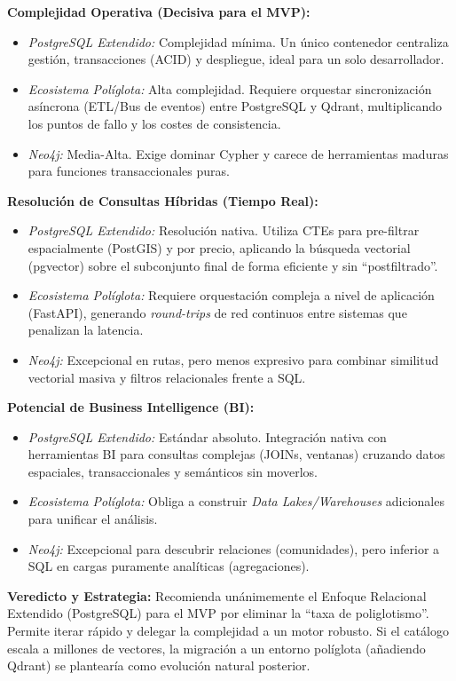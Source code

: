 \begin{tcolorbox}[colback=responsecolor, title=Insights de DeepSeek, colframe=gray!60!black, breakable]
	\textbf{Complejidad Operativa (Decisiva para el MVP):}
	\begin{itemize}
		\item \textit{PostgreSQL Extendido:} Complejidad mínima. Un único contenedor centraliza gestión, transacciones (ACID) y despliegue, ideal para un solo desarrollador.
		\item \textit{Ecosistema Políglota:} Alta complejidad. Requiere orquestar sincronización asíncrona (ETL/Bus de eventos) entre PostgreSQL y Qdrant, multiplicando los puntos de fallo y los costes de consistencia.
		\item \textit{Neo4j:} Media-Alta. Exige dominar Cypher y carece de herramientas maduras para funciones transaccionales puras.
	\end{itemize}

	\textbf{Resolución de Consultas Híbridas (Tiempo Real):}
	\begin{itemize}
		\item \textit{PostgreSQL Extendido:} Resolución nativa. Utiliza CTEs para pre-filtrar espacialmente (PostGIS) y por precio, aplicando la búsqueda vectorial (pgvector) sobre el subconjunto final de forma eficiente y sin ``postfiltrado''.
		\item \textit{Ecosistema Políglota:} Requiere orquestación compleja a nivel de aplicación (FastAPI), generando \textit{round-trips} de red continuos entre sistemas que penalizan la latencia.
		\item \textit{Neo4j:} Excepcional en rutas, pero menos expresivo para combinar similitud vectorial masiva y filtros relacionales frente a SQL.
	\end{itemize}

	\textbf{Potencial de Business Intelligence (BI):}
	\begin{itemize}
		\item \textit{PostgreSQL Extendido:} Estándar absoluto. Integración nativa con herramientas BI para consultas complejas (JOINs, ventanas) cruzando datos espaciales, transaccionales y semánticos sin moverlos.
		\item \textit{Ecosistema Políglota:} Obliga a construir \textit{Data Lakes/Warehouses} adicionales para unificar el análisis.
		\item \textit{Neo4j:} Excepcional para descubrir relaciones (comunidades), pero inferior a SQL en cargas puramente analíticas (agregaciones).
	\end{itemize}

	\textbf{Veredicto y Estrategia:} Recomienda unánimemente el Enfoque Relacional Extendido (PostgreSQL) para el MVP por eliminar la ``taxa de poliglotismo''. Permite iterar rápido y delegar la complejidad a un motor robusto. Si el catálogo escala a millones de vectores, la migración a un entorno políglota (añadiendo Qdrant) se plantearía como evolución natural posterior.
\end{tcolorbox}

